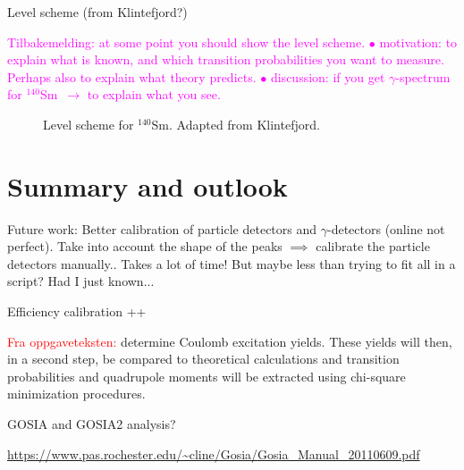 \documentclass[twoside,english]{uiofysmaster/uiofysmaster}
\newcommand{\Sm}{$^{140}$Sm} %
\newcommand{\ga}{$\gamma$}
\begin{document}
Level scheme (from Klintefjord?)\newline

\textcolor{Magenta}{Tilbakemelding: \newline
at some point you should show the level scheme. \newline
$\bullet$ motivation: to explain what is known, and which transition probabilities you want to measure.  \newline
Perhaps also to explain what theory predicts. \newline
$\bullet$ discussion: if you get \ga-spectrum for \Sm\ $\rightarrow$ to explain what you see.}


\begin{figure}
	\centering
	
	\caption{Level scheme for \Sm. Adapted from Klintefjord.}
	\label{fig:levels}
\end{figure}





\chapter{Summary and outlook}

Future work: Better calibration of particle detectors and \ga-detectors (online not perfect). Take into account the shape of the peaks $\implies$ calibrate the particle detectors manually.. Takes a lot of time! But maybe less than trying to fit all in a script? Had I just known...

\bigskip

Efficiency calibration ++

\bigskip

\textcolor{red}{Fra oppgaveteksten:} \newline
determine Coulomb excitation yields. These yields will then, in a second step, be compared to theoretical calculations and transition probabilities and quadrupole moments will be extracted using chi-square minimization procedures.


GOSIA and GOSIA2 analysis?

\url{https://www.pas.rochester.edu/~cline/Gosia/Gosia_Manual_20110609.pdf}

\end{document}

